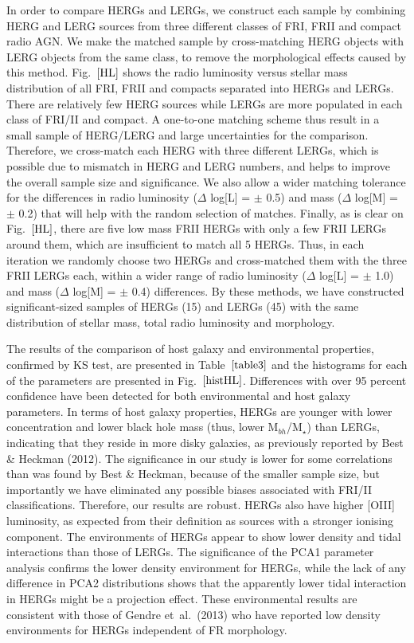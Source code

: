 \documentclass[usenatbib]{mn2e}
\begin{document}
In order to compare HERGs and LERGs, we construct each sample by combining
HERG and LERG sources from three different classes of FRI, FRII and
compact radio AGN. We make the matched sample by cross-matching HERG
objects with LERG objects from the same class, to remove the morphological
effects caused by this method. Fig.~$\ref{HL}$ shows the radio luminosity versus stellar
mass distribution of all FRI, FRII and compacts separated into HERGs and
LERGs. There are relatively few HERG sources while LERGs are more
populated in each class of FRI/II and compact. A one-to-one matching
scheme thus result in a small sample of HERG/LERG and large uncertainties
for the comparison. Therefore, we cross-match each HERG with three
different LERGs, which is possible due to mismatch in HERG and LERG
numbers, and helps to improve the overall sample size and significance. We
also allow a wider matching tolerance for the differences in radio
luminosity ($\Delta$ log[L] = $\pm$ 0.5) and mass ($\Delta$ log[M] = $\pm$
0.2) that will help with the random selection of matches. Finally, as is
clear on Fig.~$\ref{HL}$, there are five low mass FRII HERGs with only a few FRII
LERGs around them, which are insufficient to match all 5 HERGs. Thus, in
each iteration we randomly choose two HERGs and cross-matched them with
the three FRII LERGs each, within a wider range of radio luminosity
($\Delta$ log[L] = $\pm $ 1.0) and mass ($\Delta$ log[M] = $\pm $ 0.4)
differences. By these methods, we have constructed significant-sized
samples of HERGs (15) and LERGs (45) with the same distribution of stellar
mass, total radio luminosity and morphology.

The results of the comparison of host galaxy and environmental properties,
confirmed by KS test, are presented in Table~$\ref{table3}$ and the
histograms for each of the parameters are presented in
Fig.~$\ref{histHL}$. Differences with over 95 percent confidence have been detected
for both environmental and host galaxy parameters. In terms of host galaxy
properties, HERGs are younger with lower concentration and lower black
hole mass (thus, lower M$_{bh}$/M$_{\star}$) than LERGs, indicating that
they reside in more disky galaxies, as previously reported by Best \&
Heckman (2012). The significance in our study is lower for some
correlations than was found by Best \& Heckman, because of the smaller
sample size, but importantly we have eliminated any possible biases
associated with FRI/II classifications. Therefore, our results are robust.
HERGs also have higher [OIII] luminosity, as expected from their
definition as sources with a stronger ionising component. The environments
of HERGs appear to show lower density and tidal interactions than those of
LERGs. The significance of the PCA1 parameter analysis confirms the lower
density environment for HERGs, while the lack of any difference in PCA2
distributions shows that the apparently lower tidal interaction in HERGs
might be a projection effect. These environmental results are consistent
with those of Gendre et~al.\ (2013) who have reported low density
environments for HERGs independent of FR morphology.
\end{document}

